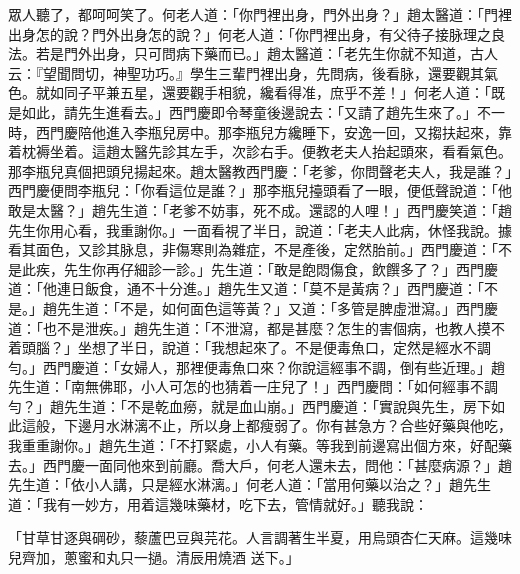 \begin{showcontents}{}
眾人聽了，都呵呵笑了。何老人道：「你門裡出身，門外出身？」趙太醫道：「門裡出身怎的說？門外出身怎的說？」何老人道：「你門裡出身，有父待子接脉理之良法。若是門外出身，只可問病下藥而已。」趙太醫道：「老先生你就不知道，古人云：『望聞問切，神聖功巧。』學生三輩門裡出身，先問病，後看脉，還要觀其氣色。就如同子平兼五星，還要觀手相貌，纔看得准，庶乎不差！」何老人道：「既是如此，請先生進看去。」西門慶即令琴童後邊說去：「又請了趙先生來了。」不一時，西門慶陪他進入李瓶兒房中。那李瓶兒方纔睡下，安逸一回，又搊扶起來，靠着枕褥坐着。這趙太醫先診其左手，次診右手。便教老夫人抬起頭來，看看氣色。那李瓶兒真個把頭兒揚起來。趙太醫教西門慶：「老爹，你問聲老夫人，我是誰？」西門慶便問李瓶兒：「你看這位是誰？」那李瓶兒擡頭看了一眼，便低聲說道：「他敢是太醫？」趙先生道：「老爹不妨事，死不成。還認的人哩！」西門慶笑道：「趙先生你用心看，我重謝你。」一面看視了半日，說道：「老夫人此病，休怪我說。據看其面色，又診其脉息，非傷寒則為雜症，不是產後，定然胎前。」西門慶道：「不是此疾，先生你再仔細診一診。」先生道：「敢是飽悶傷食，飲饌多了？」西門慶道：「他連日飯食，通不十分進。」趙先生又道：「莫不是黃病？」西門慶道：「不是。」趙先生道：「不是，如何面色這等黃？」又道：「多管是脾虛泄瀉。」西門慶道：「也不是泄疾。」趙先生道：「不泄瀉，都是甚麼？怎生的害個病，也教人摸不着頭腦？」坐想了半日，說道：「我想起來了。不是便毒魚口，定然是經水不調勻。」西門慶道：「女婦人，那裡便毒魚口來？你說這經事不調，倒有些近理。」趙先生道：「南無佛耶，小人可怎的也猜着一庄兒了！」西門慶問：「如何經事不調勻？」趙先生道：「不是乾血癆，就是血山崩。」西門慶道：「實說與先生，房下如此這般，下邊月水淋漓不止，所以身上都瘦弱了。你有甚急方？合些好藥與他吃，我重重謝你。」趙先生道：「不打緊處，小人有藥。等我到前邊寫出個方來，好配藥去。」西門慶一面同他來到前廳。喬大戶，何老人還未去，問他：「甚麼病源？」趙先生道：「依小人講，只是經水淋漓。」何老人道：「當用何藥以治之？」趙先生道：「我有一妙方，用着這幾味藥材，吃下去，管情就好。」聽我說：

「甘草甘逐與碙砂，藜蘆巴豆與芫花。人言調著生半夏，用烏頭杏仁天麻。這幾味兒齊加，蔥蜜和丸只一撾。清辰用燒酒 送下。」


\end{showcontents}
